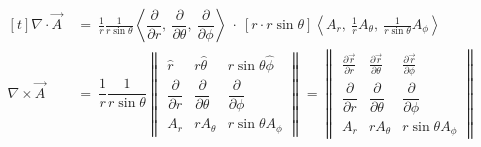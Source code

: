 \documentclass[12pt]{article}
\newcommand{\hs}{\hspace{1pt}} %
\newcommand{\hsvec}[1]{\vec{\hs #1}} %
\begin{document}
{	\vspace{15pt}
	\(\begin{aligned}[t]
		\nabla \cdot \vec{A} \ & 
			= \ \frac{1}{r} \frac{1}{r \sin{\theta}} 
			\left\langle 
				\dfrac{\partial}{\partial r} , \ 
				\dfrac{\partial}{\partial \theta} , \ 
				\dfrac{\partial}{\partial \phi} 
			\right\rangle 
			\ \cdot \ [ r \cdot r \sin{\theta} ]
			\left\langle A_r , \ \frac{1}{r} A_\theta , \ \frac{1}{ r \sin{\theta} } A_\phi \right\rangle
			\\[15pt]
		\nabla \times \vec{A} \ & 
			= \ \dfrac{1}{r} \dfrac{1}{ r \sin{\theta} } 
			\begin{Vmatrix}
				\hat{r} 					 & r \hat{\theta} 			    & r \sin{\theta} \hat{\phi}\\[10pt]
				\dfrac{\partial}{\partial r} & \dfrac{\partial}{\partial \theta} & \dfrac{\partial}{\partial \phi}\\[10pt]
				A_r							 & r A_\theta				    & r \sin{\theta} A_\phi
			\end{Vmatrix}
			= 
			\begin{Vmatrix}
				\tfrac{\partial \hsvec{r}}{\partial r}  
					& \tfrac{\partial \hsvec{r}}{\partial \theta} 
					& \tfrac{\partial \hsvec{r}}{\partial \phi} 
					\\[10pt]
				\dfrac{\partial}{\partial r} & \dfrac{\partial}{\partial \theta} & \dfrac{\partial}{\partial \phi}\\[10pt]
				A_r							 & r A_\theta				    & r \sin{\theta} A_\phi
			\end{Vmatrix}
	\end{aligned}\)

}
\end{document}

